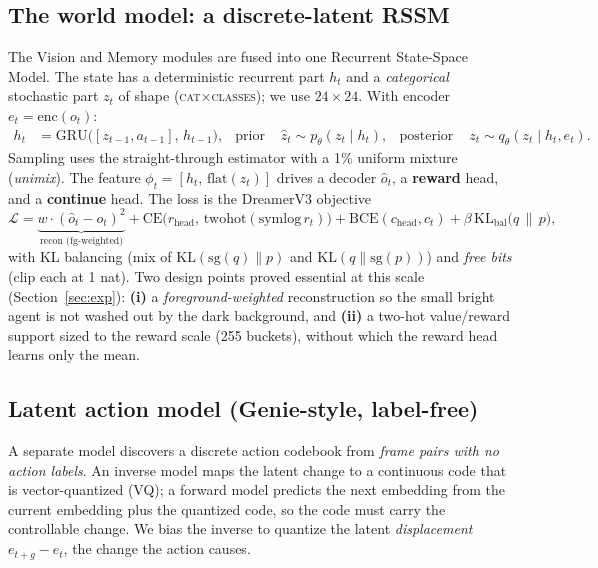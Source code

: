 \documentclass[11pt]{article}
\begin{document}
\subsection{The world model: a discrete-latent RSSM}
The Vision and Memory modules are fused into one Recurrent State-Space Model. The
state has a deterministic recurrent part $h_t$ and a \emph{categorical} stochastic
part $z_t$ of shape (\textsc{cat}$\times$\textsc{classes}); we use $24\times24$.
With encoder $e_t=\mathrm{enc}(o_t)$:
\begin{align}
h_t &= \mathrm{GRU}\big([z_{t-1},a_{t-1}],\,h_{t-1}\big), &
\text{prior } &\hat z_t \sim p_\theta(z_t\mid h_t), &
\text{posterior } & z_t \sim q_\theta(z_t\mid h_t,e_t).
\end{align}
Sampling uses the straight-through estimator with a 1\% uniform mixture
(\emph{unimix}). The feature $\phi_t=[h_t,\,\mathrm{flat}(z_t)]$ drives a decoder
$\hat o_t$, a \textbf{reward} head, and a \textbf{continue} head. The loss is the
DreamerV3 objective
\begin{equation}
\mathcal L = \underbrace{w\!\cdot\!(\hat o_t-o_t)^2}_{\text{recon (fg-weighted)}}
+ \mathrm{CE}\big(r_{\text{head}},\,\text{twohot}(\mathrm{symlog}\,r_t)\big)
+ \mathrm{BCE}(c_{\text{head}},c_t)
+ \beta\,\mathrm{KL}_{\text{bal}}\!\big(q\,\|\,p\big),
\end{equation}
with KL balancing (mix of $\mathrm{KL}(\mathrm{sg}(q)\|p)$ and
$\mathrm{KL}(q\|\mathrm{sg}(p))$) and \emph{free bits} (clip each at 1 nat).
Two design points proved essential at this scale (Section~\ref{sec:exp}):
\textbf{(i)} a \emph{foreground-weighted} reconstruction so the small bright agent is
not washed out by the dark background, and \textbf{(ii)} a two-hot value/reward
support sized to the reward scale (255 buckets), without which the reward head
learns only the mean.

\subsection{Latent action model (Genie-style, label-free)}
\label{sec:lam}
A separate model discovers a discrete action codebook from \emph{frame pairs with no
action labels}. An inverse model maps the latent change to a continuous code that is
vector-quantized (VQ); a forward model predicts the next embedding from the current
embedding plus the quantized code, so the code must carry the controllable change.
We bias the inverse to quantize the latent \emph{displacement} $e_{t+g}-e_t$, the
change the action causes.
\end{document}
